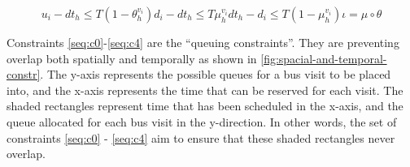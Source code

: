 \documentclass[11pt,a4paper,final]{article}
\begin{document}
\begin{multicols}{2}
\begin{subequations}
\begin{equation}
      \label{seq:c13}
       u_i - dt_h \le T(1 - \theta_h^{v_i})
  \end{equation}
  \begin{equation}
      \label{seq:c14}
      d_i - dt_h \le T\mu_h^{v_i}
  \end{equation}
  \begin{equation}
      \label{seq:c15}
      dt_h - d_i \le T(1 - \mu_h^{v_i})
  \end{equation}
  \begin{equation}
      \label{seq:c16}
      \iota = \mu \circ \theta
  \end{equation}
\end{subequations}
\end{multicols}

Constraints \ref{seq:c0}-\ref{seq:c4} are the ``queuing constraints''. They are preventing overlap both spatially and
temporally as shown in \ref{fig:spacial-and-temporal-constr}. The y-axis represents the possible queues for a bus visit to be
placed into, and the x-axis represents the time that can be reserved for each visit. The shaded rectangles represent
time that has been scheduled in the x-axis, and the queue allocated for each bus visit in the y-direction. In other
words, the set of constraints \ref{seq:c0} - \ref{seq:c4} aim to ensure that these shaded rectangles never overlap.
\end{document}

